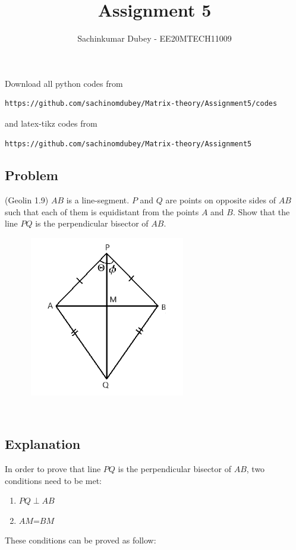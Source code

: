 \documentclass[journal,12pt,twocolumn]{IEEEtran}
\begin{document}
\def\putbox#1#2#3{\makebox[0in][l]{\makebox[#1][l]{}\raisebox{\baselineskip}[0in][0in]{\raisebox{#2}[0in][0in]{#3}}}}
     \def\rightbox#1{\makebox[0in][r]{#1}}
     \def\centbox#1{\makebox[0in]{#1}}
     \def\topbox#1{\raisebox{-\baselineskip}[0in][0in]{#1}}
     \def\midbox#1{\raisebox{-0.5\baselineskip}[0in][0in]{#1}}
\vspace{3cm}
\title{Assignment 5}
\author{Sachinkumar Dubey - EE20MTECH11009}
\maketitle
\newpage
\bigskip
\renewcommand{\thefigure}{\theenumi}
\renewcommand{\thetable}{\theenumi}
Download all python codes from 
\begin{lstlisting}
https://github.com/sachinomdubey/Matrix-theory/Assignment5/codes
\end{lstlisting}
%
and latex-tikz codes from 
%
\begin{lstlisting}
https://github.com/sachinomdubey/Matrix-theory/Assignment5
\end{lstlisting}
\subsection{Problem}
(Geolin 1.9) $AB$ is a line-segment. $P$ and $Q$ are points on opposite sides of $AB$ such that each of them is equidistant from the points $A$ and $B$. Show that the line $PQ $ is the perpendicular bisector of $AB$.\\
\begin{figure}[h!]
\centering
\includegraphics[width=7cm, height=7cm]{Figure_51}
\caption{}
\label{Fig4}
\end{figure}
\\
\subsection{Explanation}
In order to prove that line $PQ $ is the perpendicular bisector of $AB$, two conditions need to be met:
\begin{enumerate}
        \item $PQ \perp AB $
    \item $AM$=$BM$
\end{enumerate}
These conditions can be proved as follow:
\end{document}
